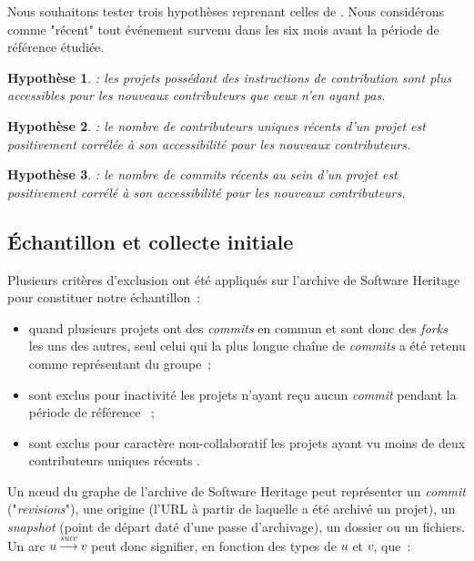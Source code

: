 \documentclass[dvipsnames,runningheads]{llncs}
\newcommand{\en}[1]{\foreignlanguage{english}{\emph{#1}}}
\newtheorem{hypo}{Hypothèse}[theorem]
\begin{document}
    Nous souhaitons tester trois hypothèses reprenant celles de \textcite{signals-2019}. Nous considérons
    comme "récent" tout événement survenu dans les six mois avant la période de référence étudiée.

    \newcommand{\newhyp}[2]{%
        \begin{hypo}
            \label{hyp:#1}: #2
        \end{hypo}%
    }

    \newhyp{contributionguidelines}{%
        les projets possédant des instructions de contribution sont plus accessibles pour les nouveaux
        contributeurs que ceux n'en ayant pas.%
    }

    \newhyp{recentcontributorcount}{%
        le nombre de contributeurs uniques récents d'un projet est positivement corrélée à son accessibilité
        pour les nouveaux contributeurs.%
    }

    \newhyp{recentcommitcount}{%
        le nombre de \en{commits} récents au sein d'un projet est positivement corrélé à son accessibilité
        pour les nouveaux contributeurs.%
    }

    \subsection{Échantillon et collecte initiale}
    \label{sec:constitution_echantillon}

    Plusieurs critères d'exclusion ont été appliqués sur l'archive de Software Heritage pour constituer notre
    échantillon :

    \begin{itemize}
        \item quand plusieurs projets ont des \en{commits} en commun et sont donc des \en{forks} les uns des
            autres, seul celui qui la plus longue chaîne de \en{commits} a été retenu comme représentant du
            groupe ;
        \item sont exclus pour inactivité les projets n'ayant reçu aucun \en{commit} pendant la période de
            référence \parencite{mining-github-2014} ;
        \item sont exclus pour caractère non-collaboratif les projets ayant vu moins de deux contributeurs
            uniques récents \parencite{mining-github-2014}.
    \end{itemize}

    Un nœud du graphe de l'archive de Software Heritage peut représenter un \en{commit} ("\en{revisions}"),
    une origine (l'URL à partir de laquelle a été archivé un projet), un \en{snapshot} (point de départ daté
    d'une passe d'archivage), un dossier ou un fichiers. Un arc $u \xrightarrow{succ} v$ peut donc signifier,
    en fonction des types de $u$ et $v$, que : 
\end{document}
